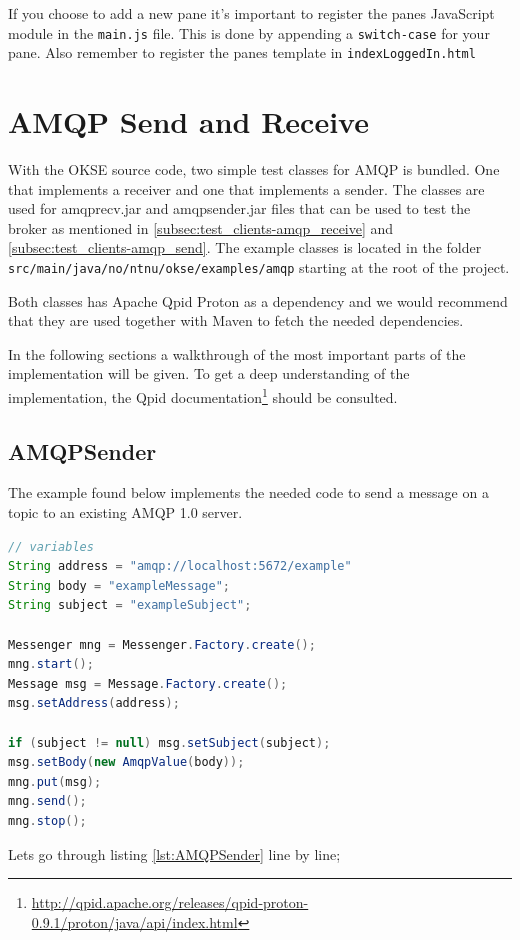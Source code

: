 If you choose to add a new pane it's important to register the panes JavaScript module in the \verb!main.js! file. This is done by appending a \verb!switch-case! for your pane. Also remember to register the panes template in \verb!indexLoggedIn.html!

\section{AMQP Send and Receive}
With the OKSE source code, two simple test classes for AMQP is bundled. One that implements a receiver and one that implements a sender. The classes are used for amqprecv.jar and amqpsender.jar files that can be used to test the broker as mentioned in \ref{subsec:test_clients-amqp_receive} and \ref{subsec:test_clients-amqp_send}. The example classes is located in the folder \verb!src/main/java/no/ntnu/okse/examples/amqp! starting at the root of the project.

Both classes has Apache Qpid Proton as a dependency and we would recommend that they are used together with Maven to fetch the needed dependencies.

In the following sections a walkthrough of the most important parts of the implementation will be given. To get a deep understanding of the implementation, the Qpid documentation\footnote{\url{http://qpid.apache.org/releases/qpid-proton-0.9.1/proton/java/api/index.html}} should be consulted.

\subsection{AMQPSender}
The example found below implements the needed code to send a message on a topic to an existing AMQP 1.0 server.

\begin{lstlisting}[language=Java, captionpos=b, caption=Example use of Messenger to subscribe, frame=bt, showstringspaces=false,label={lst:AMQPSender}]
// variables
String address = "amqp://localhost:5672/example"
String body = "exampleMessage";
String subject = "exampleSubject";

Messenger mng = Messenger.Factory.create();
mng.start();
Message msg = Message.Factory.create();
msg.setAddress(address);

if (subject != null) msg.setSubject(subject);
msg.setBody(new AmqpValue(body));
mng.put(msg);
mng.send();
mng.stop();
\end{lstlisting}

\noindent Lets go through listing \ref{lst:AMQPSender} line by line;

